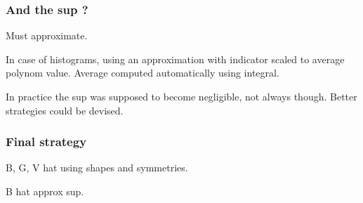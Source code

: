 \documentclass{beamer}
\begin{document}
\begin{frame}\frametitle{And the sup ?}
    Must approximate.

    In case of histograms, using an approximation with indicator scaled to average polynom value.
    Average computed automatically using integral.

    In practice the sup was supposed to become negligible, not always though.
    Better strategies could be devised.
\end{frame}

\begin{frame}\frametitle{Final strategy}

    B, G, V hat using shapes and symmetries.

    B hat approx sup.

\end{frame}
\end{document}
